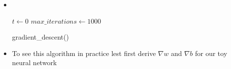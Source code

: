 \begin{frame}
	\begin{overlayarea}{\textwidth}{\textheight}
		\begin{itemize}\justifying
			\item <1-> \\
			      \onslide<2-> {
				      \begin{algorithm}[H]
					      \SetAlgoLined
					      $t \leftarrow 0$\;
					      $max\_iterations\leftarrow 1000$\;
					      \caption{gradient\_descent()}
				      \end{algorithm}
			      }
			\item <3-> To see this algorithm in practice lest first derive $\nabla w$ and $\nabla b$ for our toy neural network
		\end{itemize}
	\end{overlayarea}
\end{frame}

